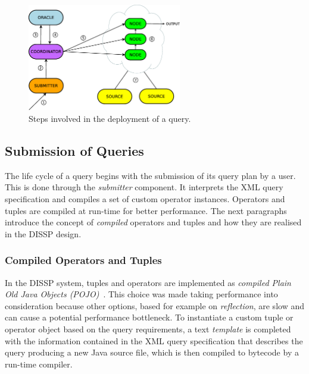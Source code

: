 \begin{figure}[t!]
	\centering
	\includegraphics[width=0.6\textwidth]{img/tesi/query_deployment.eps} 
	\caption{Steps involved in the deployment of a query.}
	\label{fig:qdep}
\end{figure} 
\vspace{-15pt}
\subsection{Submission of Queries}
\label{sec:qsub}
\vspace{-5pt}
The life cycle of a query begins with the submission of its query plan by a user. This is done through
the \emph{submitter} component. It interprets the XML query specification and compiles a set of custom
operator instances. Operators and tuples are compiled at run-time for better performance. The next
paragraphs introduce the concept of \emph{compiled} operators and tuples and how they are realised in the
DISSP design.
	
\subsubsection*{Compiled Operators and Tuples}
\label{sec:templates}
In the DISSP system, tuples and operators are implemented as \emph{compiled Plain Old Java
Objects (POJO)}~\cite{pojo}.
This choice was made taking performance into consideration because other options, based for example on
\emph{reflection}, are slow and can cause a potential performance bottleneck. To
instantiate a custom tuple or operator object based on the query requirements, a text \textit{template}
is completed with the information contained in the XML query specification that describes the query
producing a new Java source file, which is then compiled to bytecode by a run-time compiler.
